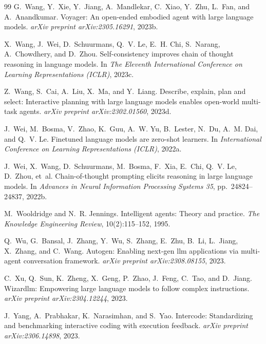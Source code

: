 \begin{thebibliography}{99}
G.~Wang, Y.~Xie, Y.~Jiang, A.~Mandlekar, C.~Xiao, Y.~Zhu, L.~Fan, and
A.~Anandkumar.
\newblock Voyager: An open-ended embodied agent with large language
models.
\newblock \emph{arXiv preprint arXiv:2305.16291}, 2023b.

X.~Wang, J.~Wei, D.~Schuurmans, Q.~V. Le, E.~H. Chi, S.~Narang,
A.~Chowdhery, and D.~Zhou.
\newblock Self-consistency improves chain of thought reasoning in language
models.
\newblock In \emph{The Eleventh International Conference on Learning
Representations (ICLR)}, 2023c.

Z.~Wang, S.~Cai, A.~Liu, X.~Ma, and Y.~Liang.
\newblock Describe, explain, plan and select: Interactive planning with
large language models enables open-world multi-task agents.
\newblock \emph{arXiv preprint arXiv:2302.01560}, 2023d.

J.~Wei, M.~Bosma, V.~Zhao, K.~Guu, A.~W. Yu, B.~Lester, N.~Du,
A.~M. Dai, and Q.~V. Le.
\newblock Finetuned language models are zero-shot learners.
\newblock In \emph{International Conference on Learning Representations
(ICLR)}, 2022a.

J.~Wei, X.~Wang, D.~Schuurmans, M.~Bosma, F.~Xia, E.~Chi, Q.~V. Le,
D.~Zhou, et~al.
\newblock Chain-of-thought prompting elicits reasoning in large language
models.
\newblock In \emph{Advances in Neural Information Processing Systems 35},
pp.\ 24824--24837, 2022b.

M.~Wooldridge and N.~R. Jennings.
\newblock Intelligent agents: Theory and practice.
\newblock \emph{The Knowledge Engineering Review}, 10(2):115--152, 1995.

Q.~Wu, G.~Bansal, J.~Zhang, Y.~Wu, S.~Zhang, E.~Zhu, B.~Li, L.~Jiang,
X.~Zhang, and C.~Wang.
\newblock Autogen: Enabling next-gen llm applications via multi-agent
conversation framework.
\newblock \emph{arXiv preprint arXiv:2308.08155}, 2023.

C.~Xu, Q.~Sun, K.~Zheng, X.~Geng, P.~Zhao, J.~Feng, C.~Tao, and D.~Jiang.
\newblock Wizardlm: Empowering large language models to follow complex
instructions.
\newblock \emph{arXiv preprint arXiv:2304.12244}, 2023.

J.~Yang, A.~Prabhakar, K.~Narasimhan, and S.~Yao.
\newblock Intercode: Standardizing and benchmarking interactive coding with
execution feedback.
\newblock \emph{arXiv preprint arXiv:2306.14898}, 2023.


\end{thebibliography}
